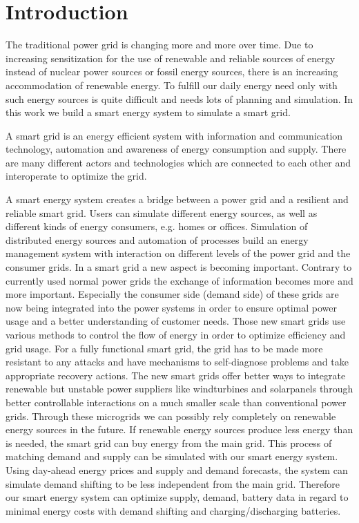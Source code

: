 \section{Introduction}

The traditional power grid is changing more and more over time.
Due to increasing sensitization for the use of renewable and reliable sources of energy instead of nuclear power sources or fossil energy sources, there is an increasing accommodation of renewable energy.
To fulfill our daily energy need only with such energy sources is quite difficult and needs lots of planning and simulation.
In this work we build a smart energy system to simulate a smart grid.

A smart grid is an energy efficient system with information and communication technology, automation and awareness of energy consumption and supply.
There are many different actors and technologies which are connected to each other and interoperate to optimize the grid.

A smart energy system creates a bridge between a power grid and a resilient and reliable smart grid.
Users can simulate different energy sources, as well as different kinds of energy consumers, e.g. homes or offices.
Simulation of distributed energy sources and automation of processes build an energy management system with interaction on different levels of the power grid and the consumer grids.
In a smart grid a new aspect is becoming important.
Contrary to currently used normal power grids the exchange of information becomes more and more important.
Especially the consumer side (demand side) of these grids are now being integrated into the power systems in order to ensure optimal power usage and a better understanding of customer needs.
Those new smart grids use various methods to control the flow of energy in order to optimize efficiency and grid usage.
For a fully functional smart grid, the grid has to be made more resistant to any attacks and have mechanisms to self-diagnose problems and take appropriate recovery actions.
The new smart grids offer better ways to integrate renewable but unstable power suppliers like  windturbines and solarpanels through better controllable interactions on a much smaller scale than conventional power grids.
Through these microgrids we can possibly rely completely on renewable energy sources in the future.
If renewable energy sources produce less energy than is needed, the smart grid can buy energy from the main grid.
This process of matching demand and supply can be simulated with our smart energy system.
Using day-ahead energy prices and supply and demand forecasts, the system can simulate demand shifting to be less independent from the main grid.
Therefore our smart energy system can optimize supply, demand, battery data in regard to minimal energy costs with demand shifting and charging/discharging batteries.


